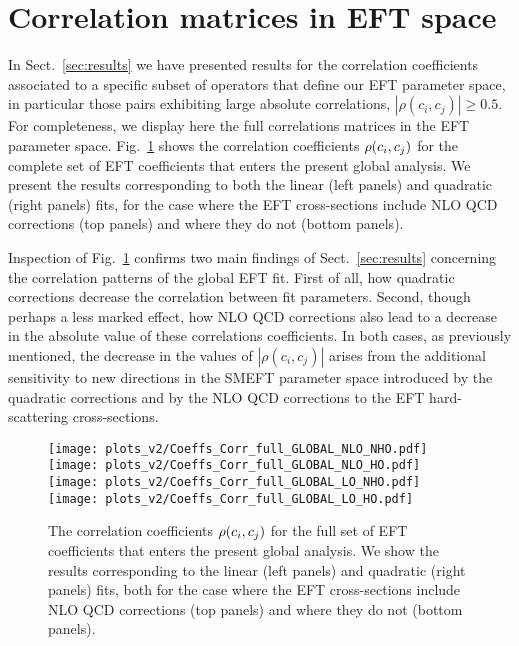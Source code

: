 \section{Correlation matrices in EFT space}
\label{sec:fullcovmat}

{ 
  In Sect.~\ref{sec:results} we have presented results for
  the correlation coefficients associated to a specific subset of operators
  that define our EFT parameter space, in particular those
  pairs exhibiting large absolute correlations, $|\rho(c_i,c_j)|\ge 0.5$.
  For completeness, we display here the full correlations
  matrices in the EFT parameter space.
  Fig.~\ref{fig:globalfitfull-correlations-NLO} shows the
  correlation coefficients $\rho\lp c_i,c_j\rp$
    for the complete set of EFT coefficients
    that enters the present global analysis.
    We present the results corresponding to both the linear
    (left panels) and quadratic (right panels) fits,
    for the case where the EFT cross-sections include
    NLO QCD corrections (top panels) and where they do not
    (bottom panels).

    Inspection of Fig.~\ref{fig:globalfitfull-correlations-NLO} confirms
    two main findings of Sect.~\ref{sec:results}
    concerning the correlation patterns of the global EFT fit.
    First of all, how quadratic corrections decrease the
    correlation between fit parameters.
    Second, though perhaps a less marked effect, how NLO QCD corrections
    also lead to a decrease in the absolute value
    of these correlations coefficients.
    In both cases, as previously mentioned, the decrease
    in the values of $|\rho(c_i,c_j)|$ arises from
    the additional sensitivity to new directions
    in the SMEFT parameter space introduced by the quadratic
    corrections and by the NLO QCD corrections to the EFT
    hard-scattering cross-sections.
}


\begin{figure}[htbp]
  \begin{center}
  \texttt{[image: plots\_v2/Coeffs\_Corr\_full\_GLOBAL\_NLO\_NHO.pdf]}
  \texttt{[image: plots\_v2/Coeffs\_Corr\_full\_GLOBAL\_NLO\_HO.pdf]}
   \texttt{[image: plots\_v2/Coeffs\_Corr\_full\_GLOBAL\_LO\_NHO.pdf]}
  \texttt{[image: plots\_v2/Coeffs\_Corr\_full\_GLOBAL\_LO\_HO.pdf]}
  \caption{\small  
    The correlation coefficients $\rho\lp c_i,c_j\rp$
    for the full set of EFT coefficients
    that enters the present global analysis.
    We show the results corresponding to the linear
    (left panels) and quadratic (right panels) fits,
    both for the case where the EFT cross-sections include
    NLO QCD corrections (top panels) and where they do not
    (bottom panels).
      \label{fig:globalfitfull-correlations-NLO} }
 \end{center}
\end{figure}


